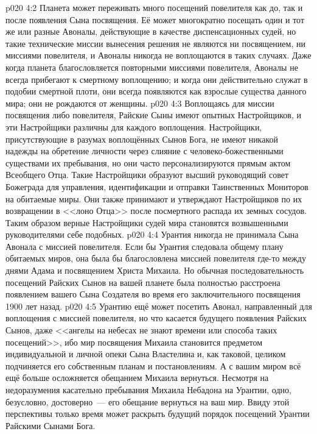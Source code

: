 \vs p020 4:2 Планета может переживать много посещений повелителя как до, так и после появления Сына посвящения. Её может многократно посещать один и тот же или разные Авоналы, действующие в качестве диспенсационных судей, но такие технические миссии вынесения решения не являются ни посвящением, ни миссиями повелителя, и Авоналы никогда не воплощаются в таких случаях. Даже когда планета благословляется повторными миссиями повелителя, Авоналы не всегда прибегают к смертному воплощению; и когда они действительно служат в подобии смертной плоти, они всегда появляются как взрослые существа данного мира; они не рождаются от женщины.
\vs p020 4:3 Воплощаясь для миссии посвящения либо повелителя, Райские Сыны имеют опытных Настройщиков, и эти Настройщики различны для каждого воплощения. Настройщики, присутствующие в разумах воплощённых Сынов Бога, не имеют никакой надежды на обретение личности через слияние с человеко\hyp{}божественными существами их пребывания, но они часто персонализируются прямым актом Всеобщего Отца. Такие Настройщики образуют высший руководящий совет Божеграда для управления, идентификации и отправки Таинственных Мониторов на обитаемые миры. Они также принимают и утверждают Настройщиков по их возвращении в <<лоно Отца>> после посмертного распада их земных сосудов. Таким образом верные Настройщики судей мира становятся возвышенными руководителями себе подобных.
\vs p020 4:4 \pc Урантия никогда не принимала Сына Авонала с миссией повелителя. Если бы Урантия следовала общему плану обитаемых миров, она была бы благословлена миссией повелителя где\hyp{}то между днями Адама и посвящением Христа Михаила. Но обычная последовательность посещений Райских Сынов на вашей планете была полностью расстроена появлением вашего Сына Создателя во время его заключительного посвящения 1900 лет назад.
\vs p020 4:5 Урантию ещё может посетить Авонал, направленный для воплощения с миссией повелителя, но что касается будущего появления Райских Сынов, даже <<ангелы на небесах не знают времени или способа таких посещений>>, ибо мир посвящения Михаила становится предметом индивидуальной и личной опеки Сына Властелина и, как таковой, целиком подчиняется его собственным планам и постановлениям. А с вашим миром всё ещё больше осложняется обещанием Михаила вернуться. Несмотря на недоразумения касательно пребывания Михаила Небадона на Урантии, одно, безусловно, достоверно~--- его обещание вернуться на ваш мир. Ввиду этой перспективы только время может раскрыть будущий порядок посещений Урантии Райскими Сынами Бога.
